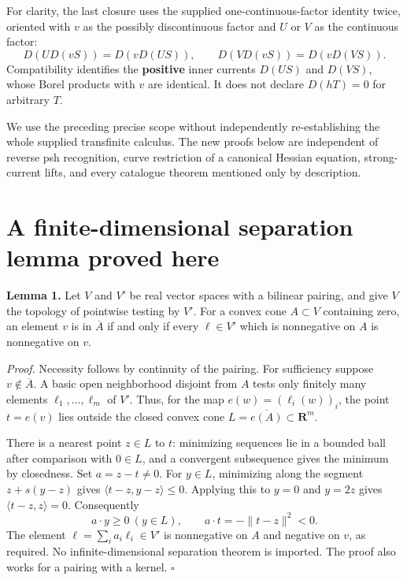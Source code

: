 \documentclass[
  11pt,
]{article}
\begin{document}
For clarity, the last closure uses the supplied one-continuous-factor
identity twice, oriented with \(v\) as the possibly discontinuous factor
and \(U\) or \(V\) as the continuous factor: \[
 D(UD(vS))=D(vD(US)),\qquad D(VD(vS))=D(vD(VS)).             \tag{3}
\] Compatibility identifies the \textbf{positive} inner currents
\(D(US)\) and \(D(VS)\), whose Borel products with \(v\) are identical.
It does not declare \(D(hT)=0\) for arbitrary \(T\).

We use the preceding precise scope without independently re-establishing
the whole supplied transfinite calculus. The new proofs below are
independent of reverse psh recognition, curve restriction of a canonical
Hessian equation, strong-current lifts, and every catalogue theorem
mentioned only by description.

\section{A finite-dimensional separation lemma proved
here}\label{a-finite-dimensional-separation-lemma-proved-here}

\textbf{Lemma 1.} Let \(V\) and \(V'\) be real vector spaces with a
bilinear pairing, and give \(V\) the topology of pointwise testing by
\(V'\). For a convex cone \(A\subset V\) containing zero, an element
\(v\) is in \(\overline A\) if and only if every \(\ell\in V'\) which is
nonnegative on \(A\) is nonnegative on \(v\).

\emph{Proof.} Necessity follows by continuity of the pairing. For
sufficiency suppose \(v\notin\overline A\). A basic open neighborhood
disjoint from \(A\) tests only finitely many elements
\(\ell_1,\ldots,\ell_m\) of \(V'\). Thus, for the map
\(e(w)=(\ell_i(w))_i\), the point \(t=e(v)\) lies outside the closed
convex cone \(L=\overline{e(A)}\subset\mathbf R^m\).

There is a nearest point \(z\in L\) to \(t\): minimizing sequences lie
in a bounded ball after comparison with \(0\in L\), and a convergent
subsequence gives the minimum by closedness. Set \(a=z-t\ne0\). For
\(y\in L\), minimizing along the segment \(z+s(y-z)\) gives
\(\langle t-z,y-z\rangle\leq0\). Applying this to \(y=0\) and \(y=2z\)
gives \(\langle t-z,z\rangle=0\). Consequently
\[a\cdot y\geq0\ (y\in L),\qquad a\cdot t=-\|t-z\|^2<0.\] The element
\(\ell=\sum_i a_i\ell_i\in V'\) is nonnegative on \(A\) and negative on
\(v\), as required. No infinite-dimensional separation theorem is
imported. The proof also works for a pairing with a kernel. \(\square\)
\end{document}
